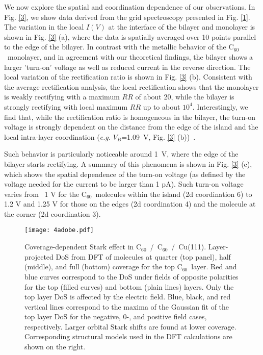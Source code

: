 \documentclass[11pt,showpacs,amsmath,amssymbl]{revtex4}
\newcommand{\buck}{C$_{60}$~}
\begin{document}
We now explore the spatial and coordination dependence of our observations. In Fig. \ref{3}, we show data derived from the grid spectroscopy presented in Fig. \ref{1}. The variation in the local $I(V)$ at the interface of the bilayer and monolayer is shown in Fig. \ref{3} (a), where the data is spatially-averaged over 10 points parallel to the edge of the bilayer. In contrast with the metallic behavior of the \buck monolayer, and in agreement with our theoretical findings, the bilayer shows a larger 'turn-on' voltage as well as reduced current in the reverse direction. The local variation of the rectification ratio is shown in Fig. \ref{3} (b). Consistent with the average rectification analysis, the local rectification shows that the monolayer is weakly rectifying with a maximum $RR$ of about 20, while the bilayer is strongly rectifying with local maximum $RR$ up to about $10^4$. Interestingly, we find that, while the rectification ratio is homogeneous in the bilayer, the turn-on voltage is strongly dependent on the distance from the edge of the island and the local intra-layer coordination ({\it e.g.} $V_B$=1.09~V, Fig. \ref{3} (b))~\cite{smerdon2016large}. 

Such behavior is particularly noticeable around 1~V, where the edge of the bilayer starts rectifying. A summary of this phenomena is shown in Fig. \ref{3} (c), which shows the spatial dependence of the turn-on voltage (as defined by the voltage needed for the current to be larger than 1 pA). Such turn-on voltage varies from ~1 V  for the \buck molecules within the island (2d coordination 6) to 1.2 V and 1.25 V for those on the edges (2d coordination 4) and the molecule at the corner (2d coordination 3).  

\begin{figure}
\texttt{[image: 4adobe.pdf]}
\caption{Coverage-dependent Stark effect in \buck/~\buck/~Cu(111). Layer-projected DoS from DFT of molecules at quarter (top panel), half (middle), and full (bottom) coverage for the top \buck layer. Red and blue  curves correspond to the DoS under fields of opposite polarities for the top  (filled curves) and bottom (plain lines) layers. Only the top layer DoS is affected by the electric field. Blue, black, and red vertical lines correspond to the maxima of the Gaussian fit of the top layer DoS for the negative, 0-, and positive field cases, respectively. Larger orbital Stark shifts are found at lower coverage. Corresponding structural models used in the DFT calculations are shown on the right.}
\label{4}
\end{figure}
\end{document}
